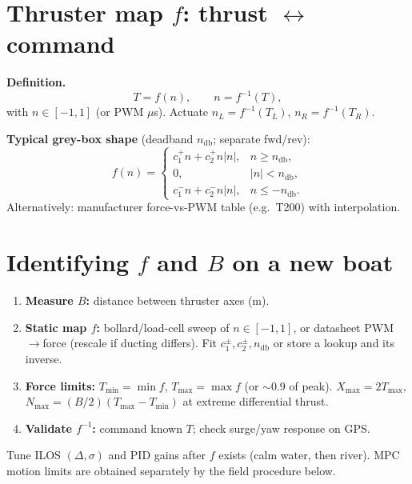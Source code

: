 \documentclass[11pt,a4paper]{article}
\begin{document}
\section{Thruster map $f$: thrust $\leftrightarrow$ command}

\textbf{Definition.}
\[
T=f(n),\qquad
n=f^{-1}(T),
\]
with \(n\in[-1,1]\) (or PWM \(\mu\)s).
Actuate \(n_L=f^{-1}(T_L)\), \(n_R=f^{-1}(T_R)\).

\textbf{Typical grey-box shape} (deadband \(n_{\mathrm{db}}\); separate fwd/rev):
\[
f(n)=\begin{cases}
c_1^+ n + c_2^+ n|n|, & n\ge n_{\mathrm{db}}, \\
0, & |n|<n_{\mathrm{db}}, \\
c_1^- n + c_2^- n|n|, & n\le -n_{\mathrm{db}}.
\end{cases}
\]
Alternatively: manufacturer force-vs-PWM table (e.g.\ T200) with interpolation.

\section{Identifying $f$ and $B$ on a new boat}
\label{sec:sysid}

\begin{enumerate}
  \item \textbf{Measure \(B\):} distance between thruster axes (m).
  \item \textbf{Static map \(f\):}
    bollard/load-cell sweep of \(n\in[-1,1]\), or datasheet PWM$\to$force
    (rescale if ducting differs). Fit \(c_1^\pm,c_2^\pm,n_{\mathrm{db}}\)
    or store a lookup and its inverse.
  \item \textbf{Force limits:}
    \(T_{\min}=\min f\), \(T_{\max}=\max f\) (or \(\sim 0.9\) of peak).
    \(X_{\max}=2T_{\max}\),
    \(N_{\max}=(B/2)(T_{\max}-T_{\min})\) at extreme differential thrust.
  \item \textbf{Validate \(f^{-1}\):} command known \(T\); check surge/yaw response on GPS.
\end{enumerate}
Tune ILOS \((\Delta,\sigma)\) and PID gains after \(f\) exists (calm water, then river).
MPC motion limits are obtained separately by the field procedure below.

\end{document}
